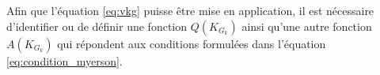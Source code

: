 Afin que l'équation \ref{eq:vkg} puisse être mise en application, il est nécessaire d'identifier ou de définir une fonction $Q(K_{G_k})$ ainsi qu'une autre fonction $A(K_{G_k})$ qui répondent aux conditions formulées dans l'équation \ref{eq:condition_myerson}.

